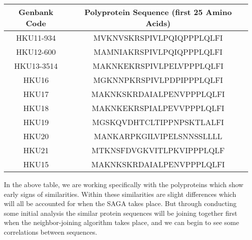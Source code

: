 \begin{center}
\begin{tabular}{||c | c||} 
 \hline
 Genbank Code & Polyprotein Sequence (first 25 Amino Acids) \\
 \hline\hline
 HKU11-934 & MVKNVSKRSPIVLPQIQPPPLQLFI \\  
 \hline
 HKU12-600 & MAMNIAKRSPIVLPQIQPPPLQLFI \\ 
 \hline
 HKU13-3514 & MAKNKEKRSPIVLPELVPPPLQLFI \\
 \hline
 HKU16 & MGKNNPKRSPIVLPDPIPPPLQLFI \\
 \hline
 HKU17 & MAKNKSKRDAIALPENVPPPLQLFI \\
 \hline
 HKU18 & MAKNKEKRSPIALPEVVPPPLQLFI \\  
 \hline
 HKU19 & MGSKQVDHTCLTIPPNPSKTLALFI \\ 
 \hline
 HKU20 & MANKARPKGILVIPELSNNSSLLLL \\ 
 \hline
 HKU21 & MTKNSFDVGKVITLPKVIPPPLQLF \\ 
 \hline
 HKU15 & MAKNKSKRDAIALPENVPPPLQLFI \\ 
 \hline
\end{tabular}
\end{center}

In the above table, we are working specifically with the polyproteins which show early signs of similarities. Within these similarities are slight differences which will all be accounted for when the SAGA takes place. But through conducting some initial analysis the similar protein sequences will be joining together first when the neighbor-joining algorithm takes place, and we can begin to see some correlations between sequences. 
   

